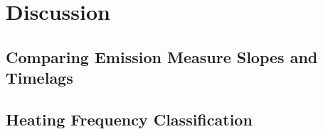 \section{Discussion}\label{sec:discussion}


\subsection{Comparing Emission Measure Slopes and Timelags}

\subsection{Heating Frequency Classification}

